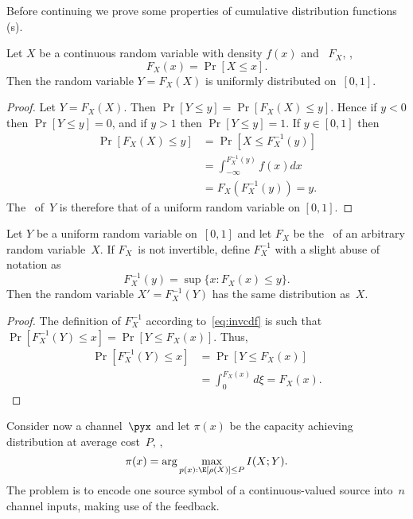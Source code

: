 Before continuing we prove some properties of cumulative distribution functions
(\cdf s).

\begin{lemma}
  \label{lem:cdfunif}
  Let $X$ be a continuous random variable with density $f(x)$ and \cdf\ $F_X$,
  \ie,
  \begin{equation*}
    F_X(x) = \Pr[X \le x].
  \end{equation*}
  Then the random variable $Y = F_X(X)$ is uniformly distributed on~$[0,1]$.
\end{lemma}

\begin{proof}
  Let $Y = F_X(X)$. Then $\Pr[Y \le y] = \Pr[F_X(X) \le y]$.
  Hence if $y < 0$ then $\Pr[Y \le y] = 0$, and if $y > 1$ then $\Pr[Y \le y] =
  1$.  If $y \in [0,1]$ then
  \begin{align*}
    \Pr[F_X(X) \le y] &= \Pr[X \le F_X^{-1}(y)] \\
    &= \int_{-\infty}^{F_X^{-1}(y)} f(x) dx \\
    &= F_X(F_X^{-1}(y)) = y.
  \end{align*}
  The \cdf\ of~$Y$ is therefore that of a uniform random variable on $[0,1]$.
\end{proof}


\begin{lemma}
  \label{lem:invcdf}
  Let $Y$ be a uniform random variable on~$[0,1]$ and let $F_X$ be the \cdf\ of
  an arbitrary random variable~$X$. If $F_X$~is not invertible, define
  $F_X^{-1}$ with a slight abuse of notation as
  \begin{equation}
    \label{eq:invcdf}
    F_X^{-1}(y) = \sup \{x : F_X(x) \le y\}.
  \end{equation}
  Then the random variable $X' = F_X^{-1}(Y)$ has the same distribution as~$X$.
\end{lemma}

\begin{proof}
  The definition of $F_X^{-1}$ according to~\eqref{eq:invcdf} is such
  that $\Pr[F_X^{-1}(Y) \le x] = \Pr[Y \le F_X(x)]$. Thus,
  \begin{align*}
    \Pr[F_X^{-1}(Y) \le x] &= \Pr[Y \le F_X(x)] \\
    &= \int_0^{F_X(x)} d\xi = F_X(x).
  \end{align*}
\end{proof}

Consider now a channel~$\pyx$ and let $\pi(x)$ be the capacity achieving
distribution at average cost~$P$, \ie, 
\begin{equation*}
  \pi(x) = \arg\max_{p(x): \E[\rho(X)] \le P} I(X;Y).
\end{equation*}
The problem is to encode one source symbol of a continuous-valued source
into~$n$ channel inputs, making use of the feedback.

